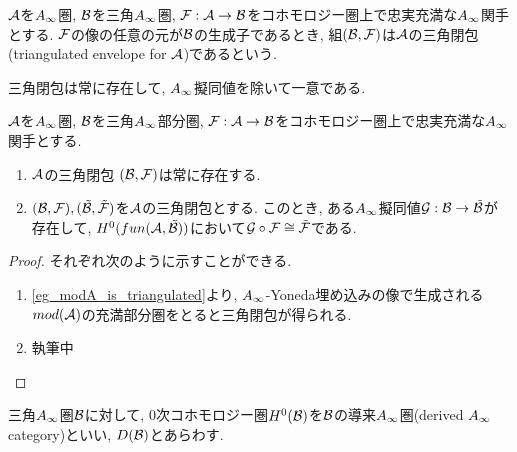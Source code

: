 \documentclass[uplatex, a4paper, 14Q, dvipdfmx]{jsarticle}
\begin{document}
\begin{definition}[三角閉包]
  $\mathcal{A}$を$\Ainf$圏, $\mathcal{B}$を三角$\Ainf$圏, $\mathcal{F} : \mathcal{A} \to \mathcal{B}$をコホモロジー圏上で忠実充満な$\Ainf$関手とする. 
  $\mathcal{F}$の像の任意の元が$\mathcal{B}$の生成子であるとき, 組$(\mathcal{B},\mathcal{F})$は$\mathcal{A}$の三角閉包 (triangulated envelope for $\mathcal{A}$)であるという. 
\end{definition}

三角閉包は常に存在して, $\Ainf$擬同値を除いて一意である. 

\begin{lemma} \label{prop_triangulated_envelope_si_always_exist}
  $\mathcal{A}$を$\Ainf$圏, $\mathcal{B}$を三角$\Ainf$部分圏, $\mathcal{F} : \mathcal{A} \to \mathcal{B}$をコホモロジー圏上で忠実充満な$\Ainf$関手とする. 
  \begin{enumerate}
    \item $\mathcal{A}$の三角閉包 $(\mathcal{B},\mathcal{F})$は常に存在する. 
    \item $(\mathcal{B},\mathcal{F}), (\tilde{\mathcal{B}},\tilde{\mathcal{F}})$を$\mathcal{A}$の三角閉包とする. 
    このとき, ある$\Ainf$擬同値$\mathcal{G} : \mathcal{B} \to \tilde{\mathcal{B}}$が存在して, $H^0(fun (\mathcal{A}, \tilde{\mathcal{B}}))$において$\mathcal{G} \circ \mathcal{F} \cong \tilde{\mathcal{F}}$である. 
  \end{enumerate}
\end{lemma}

\begin{proof}
  それぞれ次のように示すことができる.
  \begin{enumerate}
    \item \cref{eg_modA_is_triangulated}より, $\Ainf$-Yoneda埋め込みの像で生成される$mod (\mathcal{A})$の充満部分圏をとると三角閉包が得られる. 
    \item 執筆中
  \end{enumerate}
\end{proof}

\begin{definition}[導来$\Ainf$圏]
  三角$\Ainf$圏$\mathcal{B}$に対して, $0$次コホモロジー圏$H^0(\mathcal{B})$を$\mathcal{B}$の導来$\Ainf$圏(derived $\Ainf$ category)といい, $D(\mathcal{B})$とあらわす.
\end{definition}


% 
% 
\end{document}
